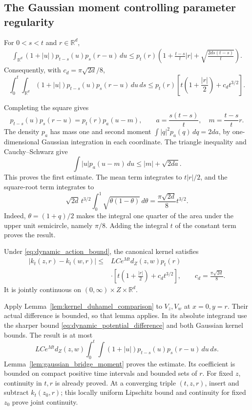 \subsection{The Gaussian moment controlling parameter regularity}
\begin{lemma}
\label{lem:gaussian_bridge_moment}
For $0<s<t$ and $r\in\mathbb R^d$,
\[
\begin{split}
\int_{\mathbb R^d}(1+|u|)p_{t-s}(u)p_s(r-u)\,du
\leq p_t(r)\left(1+\frac{t-s}{t}|r|
                     +\sqrt{\frac{2d s(t-s)}{t}}\right).
\end{split}
\]
Consequently, with $c_d=\pi\sqrt{2d}/8$,
\[
\int_0^t\int_{\mathbb R^d}(1+|u|)p_{t-s}(u)p_s(r-u)\,du\,ds
\leq p_t(r)\left[t\left(1+\frac{|r|}{2}\right)+c_dt^{3/2}\right].
\]
\end{lemma}
\Proof
Completing the square gives
\[
p_{t-s}(u)p_s(r-u)=p_t(r)p_a(u-m),\qquad
a=\frac{s(t-s)}t,\quad m=\frac{t-s}t r.
\]
The density $p_a$ has mass one and second moment
$\int |q|^2p_a(q)\,dq=2da$, by one-dimensional Gaussian integration
in each coordinate. The triangle inequality and Cauchy--Schwarz give
\[
\int |u|p_a(u-m)\,du\leq |m|+\sqrt{2da}.
\]
This proves the first estimate. The mean term integrates to $t|r|/2$,
and the square-root term integrates to
\[
\sqrt{2d}\,t^{3/2}\int_0^1\sqrt{\theta(1-\theta)}\,d\theta
=\frac{\pi\sqrt{2d}}8t^{3/2}.
\]
Indeed, $\theta=(1+q)/2$ makes the integral one quarter of the area
under the upper unit semicircle, namely $\pi/8$. Adding the integral
$t$ of the constant term proves the result.
\Done

\begin{theorem}
\label{thm:dynamic_kernel_lipschitz}
Under \eqref{eq:dynamic_action_bound}, the canonical kernel satisfies
\[
\begin{split}
|k_t(z,r)-k_t(w,r)|\leq{}&
 LC e^{Mt}d_Z(z,w)p_t(r)\\
&\cdot\left[t\left(1+\frac{|r|}{2}\right)+c_dt^{3/2}\right],
\qquad c_d=\frac{\pi\sqrt{2d}}8.
\end{split}
\tag{L}\label{eq:dynamic_kernel_lipschitz}
\]
It is jointly continuous on $(0,\infty)\times Z\times\mathbb R^d$.
\end{theorem}
\Proof
Apply Lemma~\ref{lem:kernel_duhamel_comparison} to $V_z,V_w$ at
$x=0,y=r$. Their actual difference is bounded, so that lemma applies.
In its absolute integrand use the sharper bound
\eqref{eq:dynamic_potential_difference} and both Gaussian kernel bounds.
The result is at most
\[
LC e^{Mt}d_Z(z,w)
\int_0^t\int(1+|u|)p_{t-s}(u)p_s(r-u)\,du\,ds.
\]
Lemma~\ref{lem:gaussian_bridge_moment} proves the estimate. Its coefficient
is bounded on compact positive time intervals and bounded sets of $r$.
For fixed $z$, continuity in $t,r$ is already proved. At a converging
triple $(t,z,r)$, insert and subtract $k_t(z_0,r)$; this locally uniform
Lipschitz bound and continuity for fixed $z_0$ prove joint continuity.
\Done

